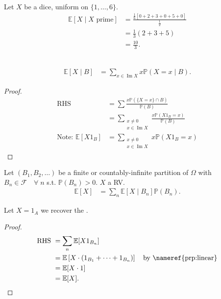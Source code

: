 \begin{example}
    Let $X$ be a dice, uniform on $\{1, \dots, 6\}$.
    \begin{align*}
        \mathbb{E}[X \mid X \text{ prime}] &= \frac{\frac{1}{6} [0 + 2 + 3 + 0 + 5 + 0]}{\frac{1}{2}} \\
        &= \frac{1}{3} (2 + 3 + 5) \\
        &= \frac{10}{3}.
    \end{align*} 
\end{example} 

\begin{definition} ~\vspace*{-1.5\baselineskip}
    \begin{align*}
        \mathbb{E}[X \mid B] &= \sum_{x \in \operatorname{Im} X} x \mathbb{P}(X = x \mid B).
    \end{align*} 
\end{definition} 

\begin{proof}
    \begin{align*}
        \text{RHS } &= \sum \frac{x \mathbb{P}(\{X = x\} \cap B)}{\mathbb{P}(B)} \\
        &= \sum_{\substack{x \neq 0 \\ x \in \operatorname{Im} X}} \frac{x \mathbb{P}(X 1_B = x)}{\mathbb{P}(B)} \\
        \text{Note: } \mathbb{E}[X 1_B] &= \sum_{\substack{x \neq 0 \\ x \in \operatorname{Im} X}} x \mathbb{P}(X 1_B = x)
    \end{align*} 
\end{proof} 

\begin{proposition} \label{prp:lte}
    Let $(B_1, B_2, \dots)$ be a finite or countably-infinite partition of $\Omega$ with $B_n \in \mathcal{F} \quad \forall \; n$ s.t. $\mathbb{P}(B_n) > 0$.
    $X$ a RV.
    \begin{align*}
        \mathbb{E}[X] &= \sum_n \mathbb{E}[X \mid B_n] \mathbb{P}(B_n).
    \end{align*} 
\end{proposition} 

\begin{example}
    Let $X = 1_A$ we recover the .
\end{example} 

\begin{proof}
    \begin{align*}
        \text{RHS } &= \sum_n \mathbb{E}[X 1_{B_n}] \\
        &= \mathbb{E}\left[X \cdot (1_{B_1} + \dots + 1_{B_n}) \right] \quad \text{by \nameref{prp:linear}}\\
        &= \mathbb{E}[X \cdot 1] \\
        &= \mathbb{E}[X].
    \end{align*} 
\end{proof} 

